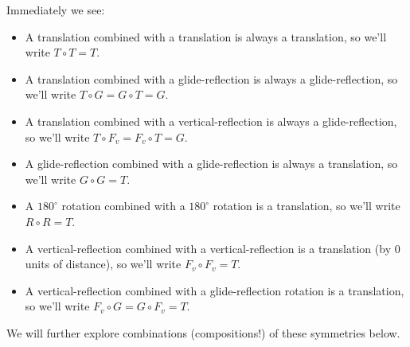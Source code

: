 \documentclass[noauthor,nooutcomes,hints,handout]{../ximera}
\begin{document}
Immediately we see:
\begin{itemize}
\item A translation combined with a translation is always a
  translation, so we'll write $T\circ T = T$.
\item A translation combined with a glide-reflection is always a
  glide-reflection, so we'll write $T\circ G = G \circ T = G$.
\item A translation combined with a vertical-reflection is always a
  glide-reflection, so we'll write $T\circ F_v = F_v \circ T = G$.
\item A glide-reflection combined with a glide-reflection is always a
  translation, so we'll write $G\circ G = T$.
\item A $180^\circ$ rotation combined with a $180^\circ$ rotation is a
  translation, so we'll write $R\circ R = T$.
\item A vertical-reflection combined with a vertical-reflection is a
  translation (by $0$ units of distance), so we'll write $F_v\circ F_v
  = T$.
\item A vertical-reflection combined with a glide-reflection rotation
  is a translation, so we'll write $F_v\circ G = G \circ F_v = T$.
\end{itemize}


We will further explore combinations (compositions!) of these symmetries below.



\mynewpage
\end{document}
